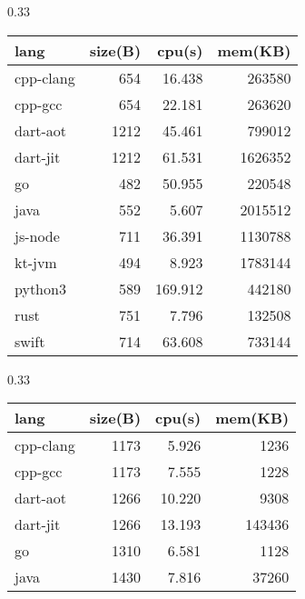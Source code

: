 \begin{table*}[htbp]
    \centering
    \caption{benchmark}
    \label{tab:result}
    \begin{subtable}[h]{0.33\linewidth}
        \centering
        \caption{Memory allocation test}
        \label{tab:binary-trees}
        \begin{tabular}{lrrr}
            \toprule
            lang      & size(B) & cpu(s)  & mem(KB) \\
            \midrule
            cpp-clang & 654     & 16.438  & 263580  \\
            cpp-gcc   & 654     & 22.181  & 263620  \\
            dart-aot  & 1212    & 45.461  & 799012  \\
            dart-jit  & 1212    & 61.531  & 1626352 \\
            go        & 482     & 50.955  & 220548  \\
            java      & 552     & 5.607   & 2015512 \\
            js-node   & 711     & 36.391  & 1130788 \\
            kt-jvm    & 494     & 8.923   & 1783144 \\
            python3   & 589     & 169.912 & 442180  \\
            rust      & 751     & 7.796   & 132508  \\
            swift     & 714     & 63.608  & 733144  \\
            \bottomrule
        \end{tabular}
    \end{subtable}
    \begin{subtable}[h]{0.33\linewidth}
        \centering
        \caption{Floating-point operation test}
        \label{tab:n-body}
        \begin{tabular}{lrrr}
            \toprule
            lang      & size(B) & cpu(s)  & mem(KB) \\
            \midrule
            cpp-clang & 1173    & 5.926   & 1236    \\
            cpp-gcc   & 1173    & 7.555   & 1228    \\
            dart-aot  & 1266    & 10.220  & 9308    \\
            dart-jit  & 1266    & 13.193  & 143436  \\
            go        & 1310    & 6.581   & 1128    \\
            java      & 1430    & 7.816   & 37260   \\

\end{tabular}
\end{subtable}
\end{table*}
